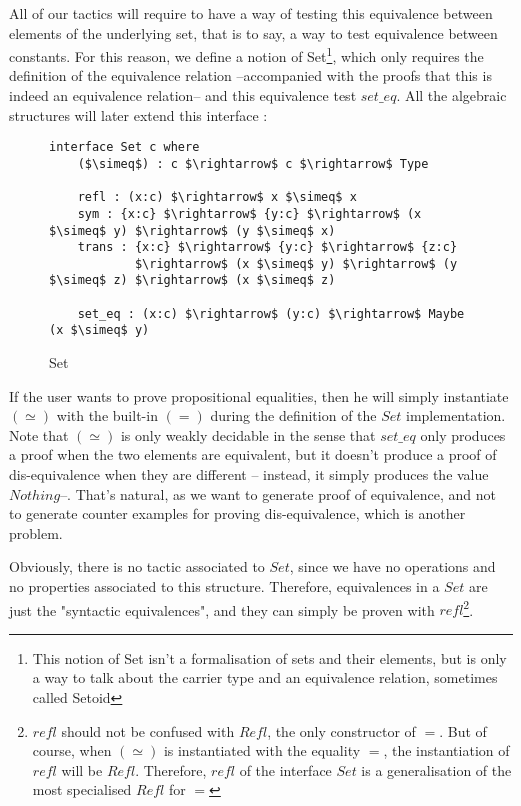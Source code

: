 All of our tactics will require to have a way of testing this equivalence between elements of the underlying set, that is to say, a way to test equivalence between constants. For this reason, we define a notion of Set\footnote{This notion of Set isn't a formalisation of sets and their elements, but is only a way to talk about the carrier type and an equivalence relation, sometimes called Setoid}, which only requires the definition of the equivalence relation --accompanied with the proofs that this is indeed an equivalence relation-- and this equivalence test $set\_eq$. All the algebraic structures will later extend this interface :

\begin{figure}[H]
\begin{center}
\begin{lstlisting}
interface Set c where
    ($\simeq$) : c $\rightarrow$ c $\rightarrow$ Type

    refl : (x:c) $\rightarrow$ x $\simeq$ x
    sym : {x:c} $\rightarrow$ {y:c} $\rightarrow$ (x $\simeq$ y) $\rightarrow$ (y $\simeq$ x)
    trans : {x:c} $\rightarrow$ {y:c} $\rightarrow$ {z:c} 
            $\rightarrow$ (x $\simeq$ y) $\rightarrow$ (y $\simeq$ z) $\rightarrow$ (x $\simeq$ z)    
    
    set_eq : (x:c) $\rightarrow$ (y:c) $\rightarrow$ Maybe (x $\simeq$ y)
\end{lstlisting}
\end{center}
\caption{Set}
\label{Set}
\end{figure}
If the user wants to prove propositional equalities, then he will simply instantiate $(\simeq)$ with the built-in $(=)$ during the definition of the $Set$ implementation.
Note that $(\simeq)$ is only weakly decidable in the sense that $set\_eq$ only produces a proof when the two elements are equivalent, but it doesn't produce a proof of dis-equivalence when they are different -- instead, it simply produces the value $Nothing$--. That's natural, as we want to generate proof of equivalence, and not to generate counter examples for proving dis-equivalence, which is another problem.

Obviously, there is no tactic associated to $Set$, since we have no operations and no properties associated to this structure. Therefore, equivalences in a $Set$ are just the "syntactic equivalences", and they can simply be proven with $refl$\footnote{$refl$ should not be confused with $Refl$, the only constructor of $=$. But of course, when $(\simeq)$ is instantiated with the equality $=$, the instantiation of $refl$ will be $Refl$. Therefore, $refl$ of the interface $Set$ is a generalisation of the most specialised $Refl$ for $=$}.

